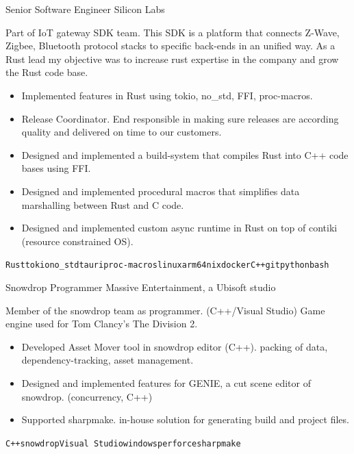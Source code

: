 \documentclass[9pt]{developercv} %
\begin{document}
\begin{entrylist}
	\entry
        {}
		{Senior Software Engineer}
        {Silicon Labs}
		{ Part of IoT gateway SDK team. This SDK is a platform that connects Z-Wave, Zigbee, Bluetooth protocol stacks to specific back-ends in an unified way. As a Rust lead my objective was to increase rust expertise in the company and grow the Rust code base.
          \begin{itemize}
           \setlength\itemsep{-0.5em}
                \item {Implemented features in Rust using tokio, no\_std, FFI, proc-macros.}
        		\item {Release Coordinator. End responsible in making sure releases are according quality and delivered on time to our customers.}
                \item {Designed and implemented a build-system that compiles Rust into C++ code bases using FFI.}
        		\item {Designed and implemented procedural macros that simplifies data marshalling between Rust and C code.}
        		\item {Designed and implemented custom async runtime in Rust on top of contiki (resource constrained OS). }
          \end{itemize}
        \texttt{Rust}\slashsep\texttt{tokio}\slashsep\texttt{no\_std}\slashsep\texttt{tauri}\slashsep\texttt{proc-macros}\slashsep\texttt{linux}\slashsep\texttt{arm64}\slashsep\texttt{nix}\slashsep\texttt{docker}\slashsep\texttt{C++}\slashsep\texttt{git}\slashsep\texttt{python}\slashsep\texttt{bash}}
	\entry
		{}
		{Snowdrop Programmer}
		{Massive Entertainment, a Ubisoft studio}
		{Member of the snowdrop team as programmer. (C++/Visual Studio) Game engine used for Tom Clancy's The Division 2.
          \begin{itemize}
           \setlength\itemsep{-0.5em}
            \item { Developed Asset Mover tool in snowdrop editor (C++). packing of data, dependency-tracking, asset management.}
            \item { Designed and implemented features for GENIE, a cut scene editor of snowdrop. (concurrency, C++) }
            \item { Supported sharpmake. in-house solution for generating build and
                project files. }
         \end{itemize}
            \texttt{C++}\slashsep\texttt{snowdrop}\slashsep\texttt{Visual Studio}\slashsep\texttt{windows}\slashsep\texttt{perforce}\slashsep\texttt{sharpmake}}

\end{entrylist}
\end{document}
